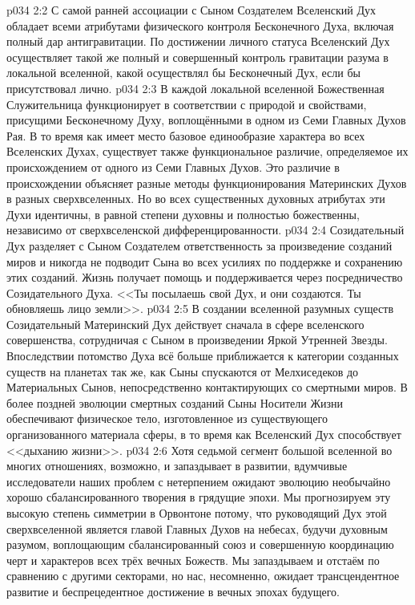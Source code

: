 \vs p034 2:2 С самой ранней ассоциации с Сыном Создателем Вселенский Дух обладает всеми атрибутами физического контроля Бесконечного Духа, включая полный дар антигравитации. По достижении личного статуса Вселенский Дух осуществляет такой же полный и совершенный контроль гравитации разума в локальной вселенной, какой осуществлял бы Бесконечный Дух, если бы присутствовал лично.
\vs p034 2:3 \pc В каждой локальной вселенной Божественная Служительница функционирует в соответствии с природой и свойствами, присущими Бесконечному Духу, воплощёнными в одном из Семи Главных Духов Рая. В то время как имеет место базовое единообразие характера во всех Вселенских Духах, существует также функциональное различие, определяемое их происхождением от одного из Семи Главных Духов. Это различие в происхождении объясняет разные методы функционирования Материнских Духов в разных сверхвселенных. Но во всех существенных духовных атрибутах эти Духи идентичны, в равной степени духовны и полностью божественны, независимо от сверхвселенской дифференцированности.
\vs p034 2:4 \pc Созидательный Дух разделяет с Сыном Создателем ответственность за произведение созданий миров и никогда не подводит Сына во всех усилиях по поддержке и сохранению этих созданий. Жизнь получает помощь и поддерживается через посредничество Созидательного Духа. <<Ты посылаешь свой Дух, и они создаются. Ты обновляешь лицо земли>>.
\vs p034 2:5 В создании вселенной разумных существ Созидательный Материнский Дух действует сначала в сфере вселенского совершенства, сотрудничая с Сыном в произведении Яркой Утренней Звезды. Впоследствии потомство Духа всё больше приближается к категории созданных существ на планетах так же, как Сыны спускаются от Мелхиседеков до Материальных Сынов, непосредственно контактирующих со смертными миров. В более поздней эволюции смертных созданий Сыны Носители Жизни обеспечивают физическое тело, изготовленное из существующего организованного материала сферы, в то время как Вселенский Дух способствует <<дыханию жизни>>.
\vs p034 2:6 \pc Хотя седьмой сегмент большой вселенной во многих отношениях, возможно, и запаздывает в развитии, вдумчивые исследователи наших проблем с нетерпением ожидают эволюцию необычайно хорошо сбалансированного творения в грядущие эпохи. Мы прогнозируем эту высокую степень симметрии в Орвонтоне потому, что руководящий Дух этой сверхвселенной является главой Главных Духов на небесах, будучи духовным разумом, воплощающим сбалансированный союз и совершенную координацию черт и характеров всех трёх вечных Божеств. Мы запаздываем и отстаём по сравнению с другими секторами, но нас, несомненно, ожидает трансцендентное развитие и беспрецедентное достижение в вечных эпохах будущего.
